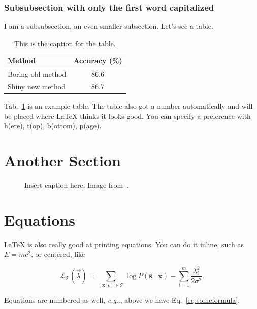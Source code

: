 \documentclass[twoside,a4paper,article]{combine}
\makeatletter
\DeclareRobustCommand\onedot{\futurelet\@let@token\@onedot}
\def\@onedot{\ifx\@let@token.\else.\null\fi\xspace}
\def\eg{\emph{e.g}\onedot} \def\Eg{\emph{E.g}\onedot}
\makeatother
\begin{document}
\subsubsection{Subsubsection with only the first word capitalized}
I am a subsubsection, an even smaller subsection. Let's see a table.

\begin{table}[h]
\centering
\begin{tabular}{lc}
\toprule
Method & Accuracy (\%) \\
\midrule
Boring old method & 86.6 \\
Shiny new method & 86.7 \\
\bottomrule
\end{tabular}
\caption{This is the caption for the table.}
\label{tab:mytable}
\end{table}

Tab.~\ref{tab:mytable} is an example table. The table also got a number automatically and will be placed where LaTeX thinks it looks good. You can specify a preference with h(ere), t(op), b(ottom), p(age).

\section{Another Section}
\label{sec:another}

\begin{figure}[h]
\centering
\caption{Insert caption here. Image from~\cite{Deng09CVPR}.}
\label{fig:example_figure}
\end{figure}


\section{Equations}
LaTeX is also really good at printing equations. You can do it inline, such as $E=mc^2$, or centered, like

\begin{equation}
\label{eq:someformula}
\mathcal L_{\mathcal T}(\vec{\lambda})
    = \sum_{(\mathbf{x},\mathbf{s})\in \mathcal T}
       \log P(\mathbf{s}\mid\mathbf{x}) - \sum_{i=1}^m
       \frac{\lambda_i^2}{2\sigma^2}.
\end{equation}

Equations are numbered as well, \eg, above we have Eq.~\ref{eq:someformula}.\cite{Kingma14Arxiv}



\end{document}

